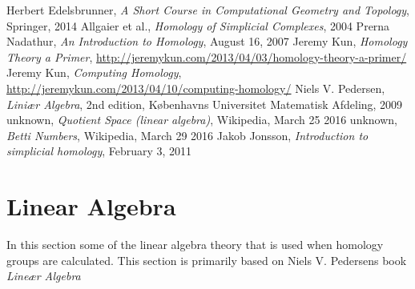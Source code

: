 \documentclass[11pt,a4paper,twoside]{report}
\begin{document}
\newpage

\begin{thebibliography}{9}
Herbert Edelsbrunner, \emph{A Short Course in Computational Geometry and Topology}, Springer, 2014
 Allgaier et al., \emph{Homology of Simplicial Complexes}, 2004
 Prerna Nadathur, \emph{An Introduction to Homology}, August 16, 2007
 Jeremy Kun, \emph{Homology Theory a Primer}, \url{http://jeremykun.com/2013/04/03/homology-theory-a-primer/}
 Jeremy Kun, \emph{Computing Homology}, \url{http://jeremykun.com/2013/04/10/computing-homology/}
 Niels V. Pedersen, \emph{Liniær Algebra}, 2nd edition, Københavns Universitet Matematisk Afdeling, 2009
 unknown, \emph{Quotient Space (linear algebra)}, Wikipedia, March 25 2016
 unknown, \emph{Betti Numbers}, Wikipedia, March 29 2016
 Jakob Jonsson, \emph{Introduction to simplicial homology}, February 3, 2011
\end{thebibliography}

\appendix
\chapter{Linear Algebra}
In this section some of the linear algebra theory that is used when homology groups are calculated. This section is primarily based on Niels V. Pedersens book \emph{Lineær Algebra}\cite{LinAlg}
\end{document}
